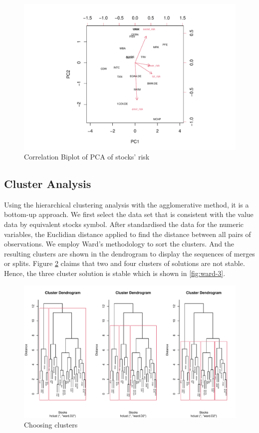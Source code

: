 \documentclass[11pt,a4paper,]{article}
\begin{document}
\begin{figure}
\centering
\includegraphics{ass2_files/figure-latex/pca-risk-correlation-1.pdf}
\caption{\label{fig:pca-risk-correlation}Correlation Biplot of PCA of stocks' risk}
\end{figure}

\hypertarget{cluster-analysis}{%
\subsection{Cluster Analysis}\label{cluster-analysis}}

Using the hierarchical clustering analysis with the agglomerative method, it is a bottom-up approach. We first select the data set that is consistent with the value data by equivalent stocks symbol. After standardised the data for the numeric variables, the Euclidian distance applied to find the distance between all pairs of observations. We employ Ward's methodology to sort the clusters. And the resulting clusters are shown in the dendrogram to display the sequences of merges or splits. Figure \ref{fig:ward} claims that two and four clusters of solutions are not stable. Hence, the three cluster solution is stable which is shown in \ref{fig:ward-3}.

\begin{figure}
\centering
\includegraphics{ass2_files/figure-latex/ward-1.pdf}
\caption{\label{fig:ward}Choosing clusters}
\end{figure}
\end{document}
